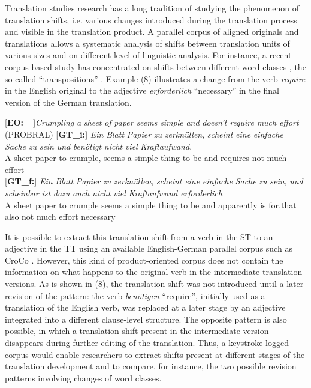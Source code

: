 \documentclass[output=paper]{LSP/langsci}
\begin{document}
Translation studies research has a long tradition of studying the phenomenon of translation shifts, i.e. various changes introduced during the translation process and visible in the translation product. A parallel corpus of aligned originals and translations allows a systematic analysis of shifts between translation units of various sizes and on different level of linguistic analysis. For instance, a recent corpus-based study has concentrated on shifts between different word classes \citep{Culo2008}, the so-called “transpositions” \citep[36]{Vinay1995/1958}. Example (8) illustrates a change from the verb \textit{require} in the English original to the adjective \textit{erforderlich} “necessary” in the final version of the German translation. 

\ea
\begin{xlist}
\exi{}[\textbf{EO:~~}]{\emph{Crumpling} \emph{a} \emph{sheet} \emph{of} \emph{paper} \emph{seems} \emph{simple} \emph{and} \emph{doesn't} \emph{require} \emph{much} \emph{effort} (PROBRAL)}
\exi{}[\textbf{GT\_i:}]{
\gll \emph{Ein} \emph{Blatt} \emph{Papier} \emph{zu} \emph{zerknüllen}, \emph{scheint} \emph{eine} \emph{einfache} \emph{Sache} \emph{zu} \emph{sein} \emph{und} \emph{benötigt} \emph{nicht} \emph{viel} \emph{Kraftaufwand}.\\
  A sheet paper to crumple, seems a simple thing to be and requires not much effort\\
}
\exi{}[\textbf{GT\_f:}]{
\gll \emph{Ein}   \emph{Blatt} \emph{Papier} \emph{zu} \emph{zerknüllen}, \emph{scheint} \emph{eine} \emph{einfache} \emph{Sache} \emph{zu} \emph{sein}, \emph{und} \emph{scheinbar} \emph{ist} \emph{dazu} \emph{auch} \emph{nicht} \emph{viel} \emph{Kraftaufwand} \emph{erforderlich}\\
A sheet paper to crumple seems a simple thing to be and apparently is for.that also not much effort necessary\\
}
\end{xlist}
\z

It is possible to extract this translation shift from a verb in the ST to an adjective in the TT using an available English-German parallel corpus such as CroCo \citep{Hansen-Schirra2012}. However, this kind of product-oriented corpus does not contain the information on what happens to the original verb in the intermediate translation versions. As is shown in (8), the translation shift was not introduced until a later revision of the pattern: the verb \textit{benötigen} “require”, initially used as a translation of the English verb, was replaced at a later stage by an adjective integrated into a different clause-level structure. The opposite pattern is also possible, in which a translation shift present in the intermediate version disappears during further editing of the translation. Thus, a keystroke logged corpus would enable researchers to extract shifts present at different stages of the translation development and to compare, for instance, the two possible revision patterns involving changes of word classes.
  
\end{document}

